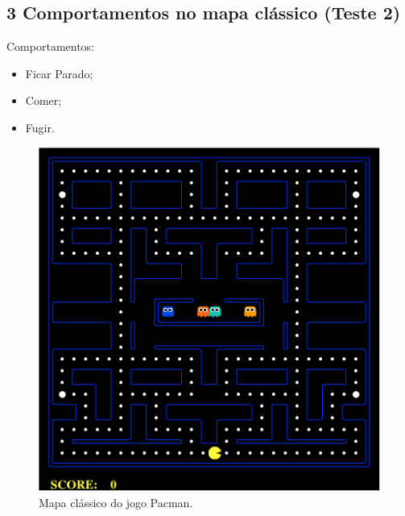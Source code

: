 \documentclass{beamer}
\begin{document}

\subsection{3 Comportamentos no mapa clássico (Teste 2)}

\begin{frame}
Comportamentos:
\begin{itemize}
	\item Ficar Parado;
	\item Comer;
	\item Fugir.
\end{itemize}

\begin{figure}[h]
    \centering
    \includegraphics[height=0.6\textheight]{images/pacman_classical_map}
    \caption{Mapa clássico do jogo Pacman.}
    \label{img:PlataformaPacmanMapaClassico}
\end{figure}
\end{frame}

\end{document}
